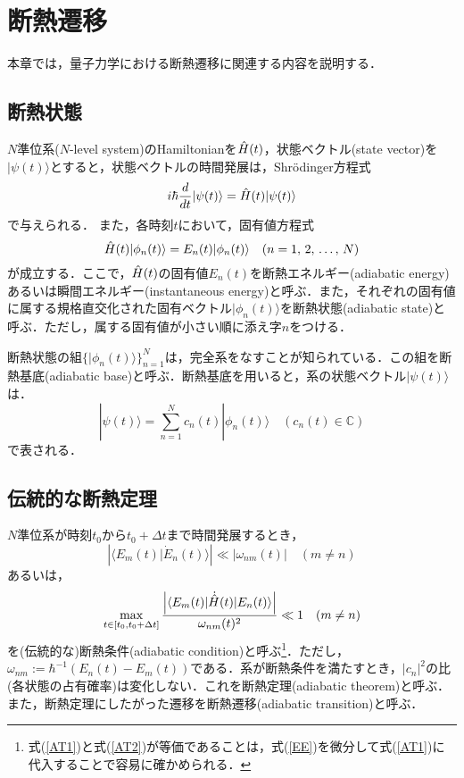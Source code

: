 \chapter{断熱遷移} \label{AT}
本章では，量子力学における断熱遷移に関連する内容を説明する．

\section{断熱状態}
$N$準位系($N$-level system)のHamiltonianを$\Hat{H}(t)$，状態ベクトル(state vector)を$|\psi(t)\rangle$とすると，状態ベクトルの時間発展は，Shr\"{o}dinger方程式
\begin{equation}
  \label{SE}
  i\hbar \frac{d}{dt} |\psi(t) \rangle = \Hat{H}(t) |\psi(t) \rangle
\end{equation}
で与えられる．
また，各時刻$t$において，固有値方程式
\begin{equation} 
  \Hat{H}(t) |\phi_n(t) \rangle = E_n(t) |\phi_n(t) \rangle \quad (n = 1,\,2,\,\ldots,\,N) \label{EE}
\end{equation}
が成立する．ここで，$\Hat{H}(t)$の固有値$E_n(t)$を断熱エネルギー(adiabatic energy)あるいは瞬間エネルギー(instantaneous energy)と呼ぶ．また，それぞれの固有値に属する規格直交化された固有ベクトル$|\phi_n(t) \rangle$を断熱状態(adiabatic state)と呼ぶ．ただし，属する固有値が小さい順に添え字$n$をつける．


断熱状態の組$\{|\phi_n(t) \rangle\}_{n=1}^N$は，完全系をなすことが知られている．この組を断熱基底(adiabatic base)と呼ぶ．断熱基底を用いると，系の状態ベクトル$|\psi(t)\rangle$は．
\begin{equation}
  |\psi(t) \rangle = \sum_{n=1}^{N} c_n(t) |\phi_n(t)\rangle  \quad (c_n(t) \in \mathbb{C})
\end{equation}
で表される．
\section{伝統的な断熱定理}
$N$準位系が時刻$t_0$から$t_0+\Delta t$まで時間発展するとき，
\begin{equation} \label{AT1}
  \left| \langle E_m(t) | \Dot{E}_n(t) \rangle \right| \ll \left| \omega_{nm}(t) \right| \quad (m\ne n)
\end{equation}
あるいは，
\begin{equation} \label{AT2}
  \max_{t\in [t_0, t_0+\Delta t]} \frac{\left| \langle E_m(t) |\Dot{\Hat{H}}(t)| E_n(t) \rangle \right|}{\omega_{nm}(t)^2} \ll 1 \quad (m\ne n)
\end{equation}
を(伝統的な)断熱条件(adiabatic condition)と呼ぶ\footnote{式(\ref{AT1})と式(\ref{AT2})が等価であることは，式(\ref{EE})を微分して式(\ref{AT1})に代入することで容易に確かめられる．}．ただし，$\omega_{nm} := \hbar^{-1} \left( E_n(t)-E_m(t) \right)$である．系が断熱条件を満たすとき，$|c_n|^2$の比(各状態の占有確率)は変化しない．これを断熱定理(adiabatic theorem)と呼ぶ．また，断熱定理にしたがった遷移を断熱遷移(adiabatic transition)と呼ぶ．

